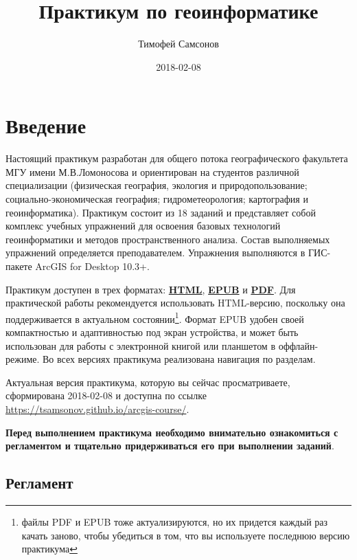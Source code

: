 \documentclass[]{book}
\title{Практикум по геоинформатике}
\author{Тимофей Самсонов}
\date{2018-02-08}
\let\rmarkdownfootnote\footnote%
\def\footnote{\protect\rmarkdownfootnote}
\theoremstyle{definition}
\theoremstyle{definition}
\theoremstyle{definition}
\theoremstyle{remark}
\begin{document}
\maketitle

{
\setcounter{tocdepth}{1}
\tableofcontents
}
\chapter*{Введение}

Настоящий практикум разработан для общего потока географического
факультета МГУ имени М.В.Ломоносова и ориентирован на студентов
различной специализации (физическая география, экология и
природопользование; социально-экономическая география;
гидрометеорология; картография и геоинформатика). Практикум состоит из
18 заданий и представляет собой комплекс учебных упражнений для освоения
базовых технологий геоинформатики и методов пространственного анализа.
Состав выполняемых упражнений определяется преподавателем. Упражнения
выполняются в ГИС-пакете ArcGIS for Desktop 10.3+.

Практикум доступен в трех форматах:
\href{https://tsamsonov.github.io/arcgis-course/}{\textbf{HTML}},
\href{https://tsamsonov.github.io/arcgis-course/arcgis-course.epub}{\textbf{EPUB}}
и
\href{https://tsamsonov.github.io/arcgis-course/arcgis-course.pdf}{\textbf{PDF}}.
Для практической работы рекомендуется использовать HTML-версию,
поскольку она поддерживается в актуальном состоянии\footnote{файлы PDF и
  EPUB тоже актуализируются, но их придется каждый раз качать заново,
  чтобы убедиться в том, что вы используете последнюю версию практикума}.
Формат EPUB удобен своей компактностью и адаптивностью под экран
устройства, и может быть использован для работы с электронной книгой или
планшетом в оффлайн-режиме. Во всех версиях практикума реализована
навигация по разделам.

Актуальная версия практикума, которую вы сейчас просматриваете,
сформирована 2018-02-08 и доступна по ссылке
\url{https://tsamsonov.github.io/arcgis-course/}.

\textbf{Перед выполнением практикума необходимо внимательно ознакомиться
с регламентом и тщательно придерживаться его при выполнении заданий}.

\section*{Регламент}
\end{document}
